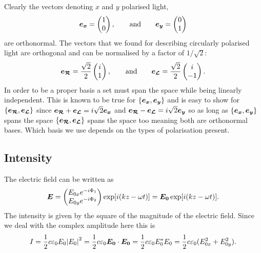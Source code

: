     Clearly the vectors denoting \(x\) and \(y\) polarised light,
    \[
        \bm{e_{x}} = 
        \begin{pmatrix}
            1\\ 0
        \end{pmatrix}
        , \qquad\text{and}\qquad \bm{e_{y}} = 
        \begin{pmatrix}
            0\\ 1
        \end{pmatrix}
    \]
    are orthonormal.
    The vectors that we found for describing circularly polarised light are orthogonal and can be normalised by a factor of \(1/\sqrt{2}\):
    \begin{equation}\label{eqn:circular basis}
        \bm{e_{\mathcal{R}}} = \frac{\sqrt{2}}{2}
        \begin{pmatrix}
            i\\ 1
        \end{pmatrix}
        , \qquad\text{and}\qquad \bm{e_{\mathcal{L}}} = \frac{\sqrt{2}}{2}
        \begin{pmatrix}
            i\\ -1
        \end{pmatrix}
        .
    \end{equation}
    In order to be a proper basis a set must span the space while being linearly independent.
    This is known to be true for \(\{\bm{e_{x}}, \bm{e_{y}}\}\) and is easy to show for \(\{\bm{e_{\mathcal{R}}}, \bm{e_{\mathcal{L}}}\}\) since \(\bm{e_{\mathcal{R}}} + \bm{e_{\mathcal{L}}} = i\sqrt{2}\bm{e_{x}}\) and \(\bm{e_{\mathcal{R}}} - \bm{e_{\mathcal{L}}} = i\sqrt{2}\bm{e_{y}}\) so as long as \(\{\bm{e_{x}}, \bm{e_{y}}\}\) spans the space \(\{\bm{e_{\mathcal{R}}}, \bm{e_{\mathcal{L}}}\}\) spans the space too meaning both are orthonormal bases.
    Which basis we use depends on the types of polarisation present.
    
    \subsection{Intensity}
    The electric field can be written as
    \[
        \bm{E} = 
        \begin{pmatrix}
            E_{0x}e^{-i\Phi_1}\\
            E_{0y}e^{-i\Phi_2}
        \end{pmatrix}
        \exp[i(kz - \omega t)] = \bm{E_0} \exp[i(kz - \omega t)].
    \]
    The intensity is given by the square of the magnitude of the electric field.
    Since we deal with the complex amplitude here this is
    \[I = \frac{1}{2}c\varepsilon_0E_0 \abs{E_0}^2 = \frac{1}{2}c\varepsilon_0\bm{E_0}\cdot\bm{E_0} = \frac{1}{2}c\varepsilon_0E_0^*E_0 = \frac{1}{2}c\varepsilon_0(E_{0x}^2 + E_{0y}^2).\]
    
